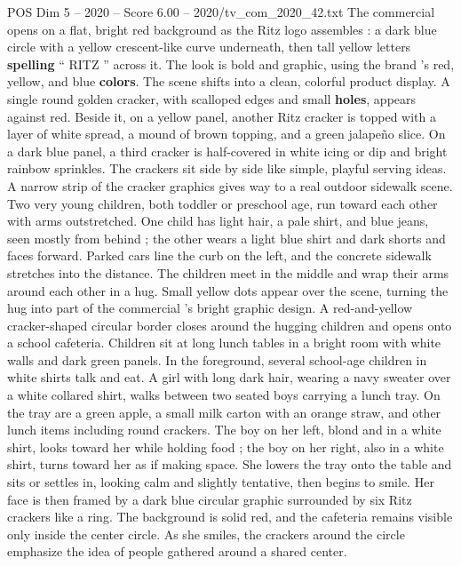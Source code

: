 \begin{textsample}{POS Dim 5 – 2020 – Score 6.00 – 2020/tv\_com\_2020\_42.txt}  \label{ex:f5_pos_070}
The commercial opens on a flat, bright red background as the Ritz logo assembles : a dark blue circle with a yellow crescent-like curve underneath, then tall yellow letters \textbf{spelling} “ RITZ ” across it.
The look is bold and graphic, using the brand ’s red, yellow, and blue \textbf{colors}.
The scene shifts into a clean, colorful product display.
A single round golden cracker, with scalloped edges and small \textbf{holes}, appears against red.
Beside it, on a yellow panel, another Ritz cracker is topped with a layer of white spread, a mound of brown topping, and a green jalapeño slice.
On a dark blue panel, a third cracker is half-covered in white icing or dip and bright rainbow sprinkles.
The crackers sit side by side like simple, playful serving ideas.
A narrow strip of the cracker graphics gives way to a real outdoor sidewalk scene.
Two very young children, both toddler or preschool age, run toward each other with arms outstretched.
One child has light hair, a pale shirt, and blue jeans, seen mostly from behind ; the other wears a light blue shirt and dark shorts and faces forward.
Parked cars line the curb on the left, and the concrete sidewalk stretches into the distance.
The children meet in the middle and wrap their arms around each other in a hug.
Small yellow dots appear over the scene, turning the hug into part of the commercial ’s bright graphic design.
A red-and-yellow cracker-shaped circular border closes around the hugging children and opens onto a school cafeteria.
Children sit at long lunch tables in a bright room with white walls and dark green panels.
In the foreground, several school-age children in white shirts talk and eat.
A girl with long dark hair, wearing a navy sweater over a white collared shirt, walks between two seated boys carrying a lunch tray.
On the tray are a green apple, a small milk carton with an orange straw, and other lunch items including round crackers.
The boy on her left, blond and in a white shirt, looks toward her while holding food ; the boy on her right, also in a white shirt, turns toward her as if making space.
She lowers the tray onto the table and sits or settles in, looking calm and slightly tentative, then begins to smile.
Her face is then framed by a dark blue circular graphic surrounded by six Ritz crackers like a ring.
The background is solid red, and the cafeteria remains visible only inside the center circle.
As she smiles, the crackers around the circle emphasize the idea of people gathered around a shared center.

\end{textsample}

